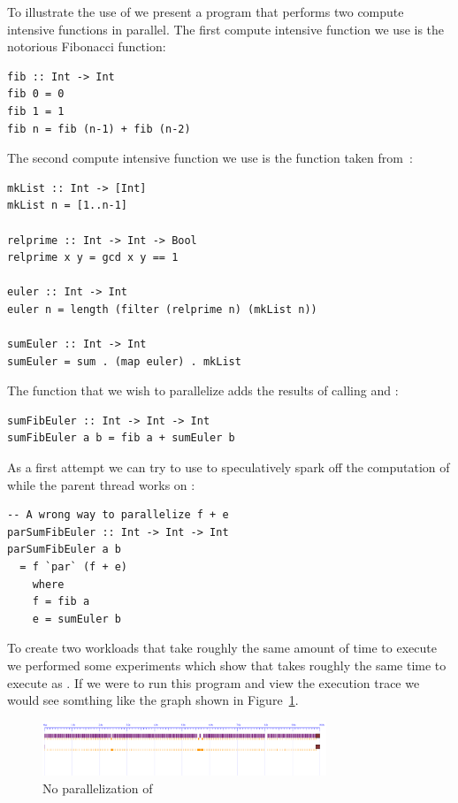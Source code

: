To illustrate the use of  we present a program that performs two compute intensive functions in parallel. The first compute intensive function we use is the notorious Fibonacci function:
\begin{lstlisting}
fib :: Int -> Int
fib 0 = 0
fib 1 = 1
fib n = fib (n-1) + fib (n-2)
\end{lstlisting}
The second compute intensive function we use is the  function taken from~\cite{trinder:02}:
\begin{lstlisting}
mkList :: Int -> [Int]
mkList n = [1..n-1]

relprime :: Int -> Int -> Bool
relprime x y = gcd x y == 1

euler :: Int -> Int
euler n = length (filter (relprime n) (mkList n))

sumEuler :: Int -> Int
sumEuler = sum . (map euler) . mkList
\end{lstlisting}
The function that we wish to parallelize adds the results of calling  and :
\begin{lstlisting}
sumFibEuler :: Int -> Int -> Int
sumFibEuler a b = fib a + sumEuler b
\end{lstlisting}
As a first attempt we can try to use  to speculatively spark off the computation of  while the parent thread works on :
\begin{lstlisting}
-- A wrong way to parallelize f + e
parSumFibEuler :: Int -> Int -> Int
parSumFibEuler a b
  = f `par` (f + e)
    where
    f = fib a
    e = sumEuler b
\end{lstlisting}

To create two workloads that take roughly the same amount of time to execute we performed some experiments which show that  takes roughly the same time to execute as . If we were to run this program and view the execution trace we would see somthing like the graph shown in Figure~\ref{f:wrongpar}.

\begin{figure}
\begin{center}
\includegraphics[width=8.5cm]{SumEuler1-N2-eventlog.pdf}
\end{center}
\caption{No parallelization of }
\label{f:wrongpar}
\end{figure}

